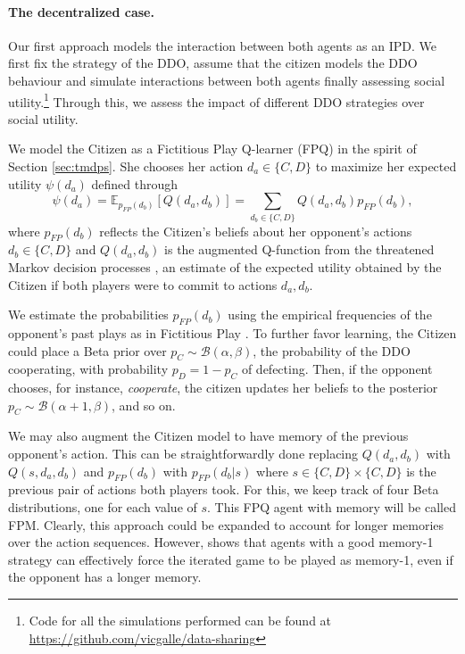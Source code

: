 \paragraph{The decentralized case.}\label{sec:decentralized}
Our first approach models the interaction between both agents as an IPD.  We first fix the strategy of the DDO, assume that the citizen models the DDO behaviour and simulate interactions between
both agents 
finally assessing social utility.\footnote{Code for all the simulations performed can be found at \url{https://github.com/vicgalle/data-sharing}}
Through this, we assess the impact of different 
DDO strategies over social utility.

We  model the Citizen as a Fictitious Play Q-learner (FPQ) in the spirit of Section \ref{sec:tmdps}.
She chooses her action $d_a \in \lbrace C, D \rbrace$
to maximize her expected utility $\psi(d_a)$
defined through 
\[ \psi(d_a) = \mathbb{E}_{p_{FP}(d_b)} [Q(d_a,d_b)] = \sum_{d_b \in \lbrace C, D \rbrace } Q(d_a, d_b) p_{FP}(d_b), \]
 where $p_{FP} (d_b)$ reflects the Citizen's beliefs about her opponent's
 actions $d_b \in \lbrace C, D \rbrace$
 and 
 $Q(d_a,d_b)$ is the augmented Q-function from the threatened Markov decision processes  \parencite{gallego2019opponent}, 
 an estimate of the expected utility obtained by the Citizen if both
 players were to commit to actions $d_a, d_b$.
 
 We estimate the probabilities $p_{FP} (d_b)$
  using the empirical frequencies of the opponent's past
  plays as in Fictitious Play 
 \parencite{brown1951iterative}. To further favor learning, the Citizen could 
place a Beta prior over $p_C \sim \mathcal{B}(\alpha, \beta)$,
the probability of the DDO cooperating, 
with probability $p_D = 1-p_C$ of defecting.
 Then, if the opponent chooses,
for instance, {\em cooperate}, the citizen updates her
beliefs to the posterior $p_C \sim \mathcal{B}(\alpha + 1, \beta)$, 
and so on. 

We may also augment the Citizen model to have memory
of the previous opponent's action. This can be
straightforwardly done replacing $Q(d_a,d_b)$ with $Q(s,d_a,d_b)$ and $p_{FP}(d_b)$ with $p_{FP}(d_b|s)$
where $s \in \lbrace C, D \rbrace \times \lbrace C, D \rbrace$ is
the previous pair of actions both players took. 
For this, we  
 keep track of four Beta distributions, one for each
value of $s$. This FPQ agent with
memory will be called FPM. 
Clearly, this approach could be expanded to account for 
longer memories over the action sequences. However,  \textcite{press2012iterated} shows that agents with a 
good memory-1 strategy can effectively force the iterated 
game to be played as memory-1, even if the opponent has a
longer memory.


